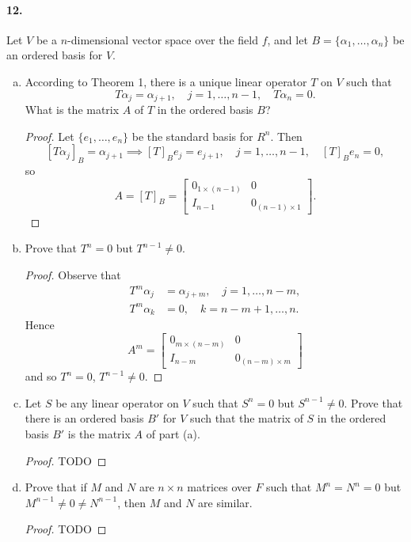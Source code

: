 \documentclass{article}
\begin{document}
\paragraph{12.} Let $V$ be a $n$-dimensional vector space over the field $f$,
and let $B = \{\alpha_1, \ldots, \alpha_n\}$ be an ordered basis for $V$.
\begin{enumerate}[(a)]
  \item According to Theorem 1, there is a unique linear operator $T$ on $V$
    such that \[
      T\alpha_j = \alpha_{j+1},\quad
      j = 1, \ldots, n - 1,\quad
      T\alpha_n = 0.
    \] What is the matrix $A$ of $T$ in the ordered basis $B$?
    \begin{proof}
      Let $\{e_1, \ldots, e_n\}$ be the standard basis for $R^n$. Then \[
        [T\alpha_j]_B = \alpha_{j+1} \implies [T]_Be_j = e_{j+1},\quad
        j = 1, \ldots, n - 1,\quad
        [T]_Be_n = 0,
      \] so \[
        A = [T]_B = \begin{bmatrix}
          0_{1 \times (n-1)} & 0 \\
          I_{n-1} & 0_{(n-1) \times 1}
        \end{bmatrix}.
      \]
    \end{proof}
  \item Prove that $T^n = 0$ but $T^{n-1} \neq 0$.
    \begin{proof}
      Observe that \begin{align*}
        T^m\alpha_j &= \alpha_{j+m},\quad
        j = 1, \ldots, n - m, \\
        T^m\alpha_k &= 0,\quad
        k = n - m + 1, \ldots, n.
      \end{align*} Hence \[
        A^m = \begin{bmatrix}
          0_{m \times (n-m)} & 0 \\
          I_{n-m} & 0_{(n-m) \times m}
        \end{bmatrix}
      \] and so $T^n = 0$, $T^{n-1} \neq 0$.
    \end{proof}
  \item Let $S$ be any linear operator on $V$ such that $S^n = 0$ but $S^{n-1}
    \neq 0$. Prove that there is an ordered basis $B'$ for $V$ such that the
    matrix of $S$ in the ordered basis $B'$ is the matrix $A$ of part (a).
    \begin{proof}
      TODO
    \end{proof}
  \item Prove that if $M$ and $N$ are $n \times n$ matrices over $F$ such that
    $M^n = N^n = 0$ but $M^{n-1} \neq 0 \neq N^{n-1}$, then $M$ and $N$ are
    similar.
    \begin{proof}
      TODO
    \end{proof}
\end{enumerate}
\end{document}
